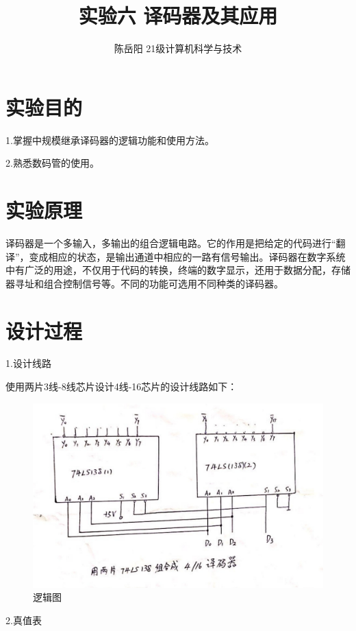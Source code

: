 \documentclass{article}
\title{实验六 译码器及其应用}
\author{陈岳阳 21级计算机科学与技术}
\begin{document}
\maketitle
\tableofcontents

\newpage
\section{实验目的}
1.掌握中规模继承译码器的逻辑功能和使用方法。

2.熟悉数码管的使用。
\section{实验原理}
译码器是一个多输入，多输出的组合逻辑电路。它的作用是把给定的代码进行“翻译”，变成相应的状态，是输出通道中相应的一路有信号输出。译码器在数字系统中有广泛的用途，不仅用于代码的转换，终端的数字显示，还用于数据分配，存储器寻址和组合控制信号等。不同的功能可选用不同种类的译码器。


\section{设计过程}
1.设计线路

使用两片3线-8线芯片设计4线-16芯片的设计线路如下：

\begin{figure}[htbp]
\centering
\includegraphics[scale=0.125]{1.jpg}
\caption{逻辑图}
\label{figure}
\end{figure}
\newpage

2.真值表
\end{document}

